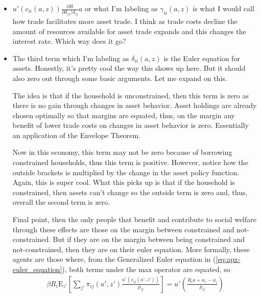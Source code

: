 \documentclass[12pt,pdftex]{article}
\begin{document}
\begin{onehalfspacing}
\begin{itemize}
\item $u'(c_{ii}(a,z))\frac{\partial R}{\partial d_{ij} / d_{ij}}a$ or what I'm labeling as $\gamma_{ii}(a,z)$ is what I would call how trade facilitates more asset trade. I think as trade costs decline the amount of resources available for asset trade expands and this changes the interest rate. Which way does it go?

\item The third term which I'm labeling as $\delta_{ii}(a,z)$  is the Euler equation for assets. Honestly, it's pretty cool the way this shows up here. But it should also zero out through some basic arguments. Let me expand on this.

    The idea is that if the household is unconstrained, then this term is zero as there is no gain through changes in asset behavior. Asset holdings are already chosen optimally so that margins are equated, thus, on the margin any benefit of lower trade costs on changes in asset behavior is zero. Essentially an application of the Envelope Theorem.

    Now in this economy, this term may not be zero because of borrowing constrained households, thus this term is positive. However, notice how the outside brackets is multiplied by the change in the asset policy function. Again, this is super cool. What this picks up is that if the household is constrained, then assets can't change so the outside term is zero and, thus, overall the second term is zero.

    Final point, then the only people that benefit and contribute to social welfare through these effects are those on the margin between constrained and not-constrained. But if they are on the margin between being constrained and not-constrained, then they are on their euler equation. More formally, these agents are those where, from the Generalized Euler equation in (\ref{eq:apx-euler_equation}), both terms under the max operator are equated, so
    \begin{align}
    \beta R_{i} \mathrm{E}_{z'} \left[ \sum_{j'} \pi_{ij}(a', z') \frac{u'(c_{ij}(a', z'))}{p_{ij}} \right]  = u' \left( \frac{R_i a + w_i - \phi_{i}}{p_{ij}} \right)
    \end{align}


\end{itemize}
\end{onehalfspacing}
\end{document}
